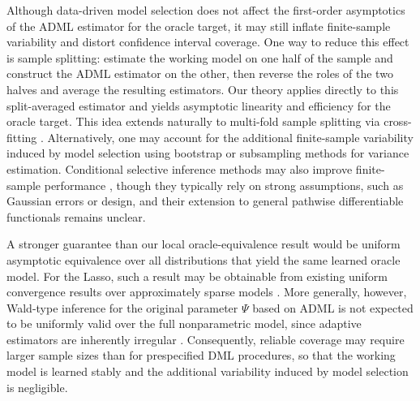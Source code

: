 \documentclass[11pt]{article}
\theoremstyle{definition}
\begin{document}
Although data-driven model selection does not affect the first-order asymptotics of the ADML estimator for the oracle target, it may still inflate finite-sample variability and distort confidence interval coverage. One way to reduce this effect is sample splitting: estimate the working model on one half of the sample and construct the ADML estimator on the other, then reverse the roles of the two halves and average the resulting estimators. Our theory applies directly to this split-averaged estimator and yields asymptotic linearity and efficiency for the oracle target. This idea extends naturally to multi-fold sample splitting via cross-fitting \citep{vanderLaanRose2011, DoubleML}. Alternatively, one may account for the additional finite-sample variability induced by model selection using bootstrap \citep{efron1994introduction, bootstrapHAL, rinaldo2019bootstrapping} or subsampling \citep{guo2023rank} methods for variance estimation. Conditional selective inference methods may also improve finite-sample performance \citep{leeb2009conditional, condSelectInf, taylor2015statistical, zhao2017selective}, though they typically rely on strong assumptions, such as Gaussian errors or design, and their extension to general pathwise differentiable functionals remains unclear.

A stronger guarantee than our local oracle-equivalence result would be uniform asymptotic equivalence over all distributions that yield the same learned oracle model. For the Lasso, such a result may be obtainable from existing uniform convergence results over approximately sparse models \citep{belloni2013honest, belloni2014inference, belloni2013least, chernozhukov2018auto}. More generally, however, Wald-type inference for the original parameter \(\Psi\) based on ADML is not expected to be uniformly valid over the full nonparametric model, since adaptive estimators are inherently irregular \citep{LeebModelSelect2005, oracleselectionHodgebad}. Consequently, reliable coverage may require larger sample sizes than for prespecified DML procedures, so that the working model is learned stably and the additional variability induced by model selection is negligible.
\end{document}
